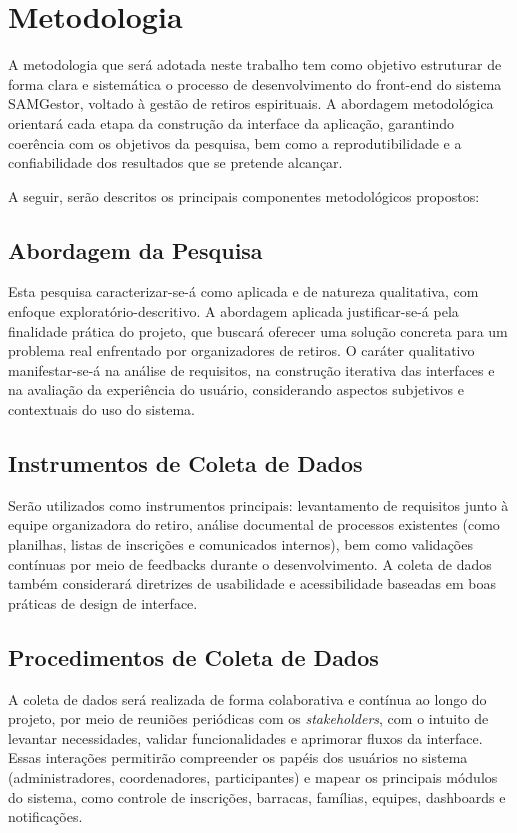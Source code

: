 \chapter{Metodologia}

A metodologia que será adotada neste trabalho tem como objetivo estruturar de forma clara e sistemática o processo de desenvolvimento do front-end do sistema SAMGestor, voltado à gestão de retiros espirituais. A abordagem metodológica orientará cada etapa da construção da interface da aplicação, garantindo coerência com os objetivos da pesquisa, bem como a reprodutibilidade e a confiabilidade dos resultados que se pretende alcançar.

A seguir, serão descritos os principais componentes metodológicos propostos:

\section{Abordagem da Pesquisa}

Esta pesquisa caracterizar-se-á como aplicada e de natureza qualitativa, com enfoque exploratório-descritivo. A abordagem aplicada justificar-se-á pela finalidade prática do projeto, que buscará oferecer uma solução concreta para um problema real enfrentado por organizadores de retiros. O caráter qualitativo manifestar-se-á na análise de requisitos, na construção iterativa das interfaces e na avaliação da experiência do usuário, considerando aspectos subjetivos e contextuais do uso do sistema.

\section{Instrumentos de Coleta de Dados}

Serão utilizados como instrumentos principais: levantamento de requisitos junto à equipe organizadora do retiro, análise documental de processos existentes (como planilhas, listas de inscrições e comunicados internos), bem como validações contínuas por meio de feedbacks durante o desenvolvimento. A coleta de dados também considerará diretrizes de usabilidade e acessibilidade baseadas em boas práticas de design de interface.

\section{Procedimentos de Coleta de Dados}

A coleta de dados será realizada de forma colaborativa e contínua ao longo do projeto, por meio de reuniões periódicas com os \textit{stakeholders}, com o intuito de levantar necessidades, validar funcionalidades e aprimorar fluxos da interface. Essas interações permitirão compreender os papéis dos usuários no sistema (administradores, coordenadores, participantes) e mapear os principais módulos do sistema, como controle de inscrições, barracas, famílias, equipes, dashboards e notificações.

